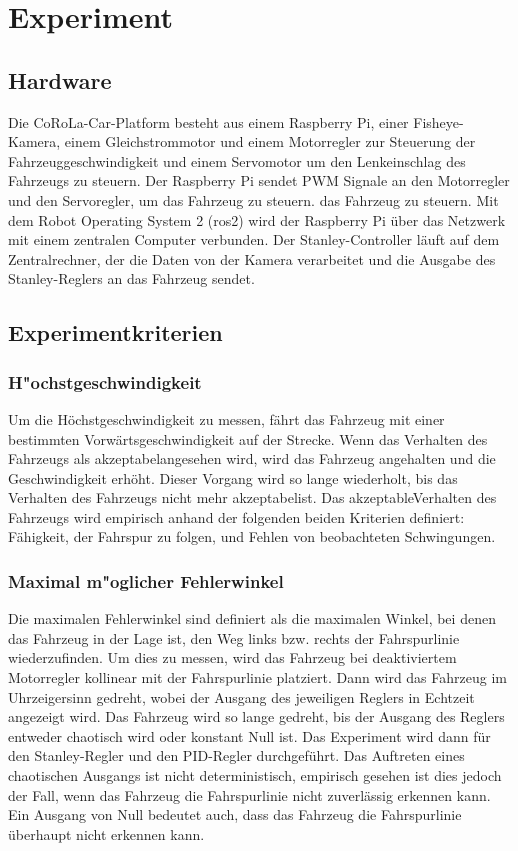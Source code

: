 \documentclass[arbeit=studie,oneside,BCOR=12mm]{ArbeitRST}
\begin{document}
\chapter{Experiment}
\section{Hardware}

Die CoRoLa-Car-Platform besteht aus einem Raspberry Pi, einer Fisheye-Kamera,
einem Gleichstrommotor und einem Motorregler zur Steuerung der
Fahrzeuggeschwindigkeit und einem Servomotor um den Lenkeinschlag des Fahrzeugs
zu steuern. Der Raspberry Pi sendet PWM Signale an den Motorregler und den
Servoregler, um das Fahrzeug zu steuern. das Fahrzeug zu steuern. Mit dem Robot
Operating System 2 (ros2) wird der Raspberry Pi über das Netzwerk mit einem
zentralen Computer verbunden. Der Stanley-Controller läuft auf dem
Zentralrechner, der die Daten von der Kamera verarbeitet und die Ausgabe des
Stanley-Reglers an das Fahrzeug sendet.

\section{Experimentkriterien}

\subsection{H"ochstgeschwindigkeit}

Um die Höchstgeschwindigkeit zu messen, fährt das Fahrzeug mit einer bestimmten
Vorwärtsgeschwindigkeit auf der Strecke. Wenn das Verhalten des Fahrzeugs als
\glqq akzeptabel\grqq angesehen wird, wird das Fahrzeug angehalten und die
Geschwindigkeit erhöht. Dieser Vorgang wird so lange wiederholt, bis das
Verhalten des Fahrzeugs nicht mehr \glqq akzeptabel\grqq ist. Das \glqq
akzeptable\grqq Verhalten des Fahrzeugs wird empirisch anhand der folgenden
beiden Kriterien definiert: Fähigkeit, der Fahrspur zu folgen, und Fehlen von
beobachteten Schwingungen.

\subsection{Maximal m"oglicher Fehlerwinkel}

Die maximalen Fehlerwinkel sind definiert als die maximalen Winkel, bei denen
das Fahrzeug in der Lage ist, den Weg links bzw. rechts der Fahrspurlinie
wiederzufinden. Um dies zu messen, wird das Fahrzeug bei deaktiviertem
Motorregler kollinear mit der Fahrspurlinie platziert. Dann wird das Fahrzeug
im Uhrzeigersinn gedreht, wobei der Ausgang des jeweiligen Reglers in Echtzeit
angezeigt wird. Das Fahrzeug wird so lange gedreht, bis der Ausgang des Reglers
entweder chaotisch wird oder konstant Null ist. Das Experiment wird dann für
den Stanley-Regler und den PID-Regler durchgeführt. Das Auftreten eines
chaotischen Ausgangs ist nicht deterministisch, empirisch gesehen ist dies
jedoch der Fall, wenn das Fahrzeug die Fahrspurlinie nicht zuverlässig erkennen
kann. Ein Ausgang von Null bedeutet auch, dass das Fahrzeug die Fahrspurlinie
überhaupt nicht erkennen kann.
\end{document}
